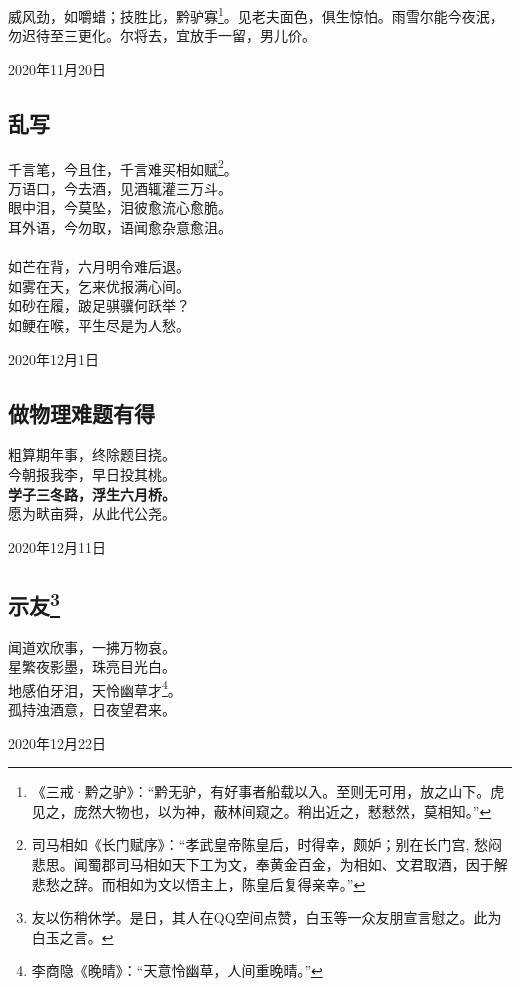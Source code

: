 \documentclass[a5paper]{ctexart}
\begin{document}
	威风劲，如嚼蜡；技胜比，黔驴寡\footnote{《三戒·黔之驴》：“黔无驴，有好事者船载以入。至则无可用，放之山下。虎见之，庞然大物也，以为神，蔽林间窥之。稍出近之，慭慭然，莫相知。”}。见老夫面色，俱生惊怕。雨雪尔能今夜泯，勿迟待至三更化。尔将去，宜放手一留，男儿价。
	\begin{flushright}
		2020年11月20日
	\end{flushright}
	
	\subsection{乱写}
	\begin{center}
		千言笔，今且住，千言难买相如赋\footnote{司马相如《长门赋序》：“孝武皇帝陈皇后，时得幸，颇妒；别在长门宫, 愁闷悲思。闻蜀郡司马相如天下工为文，奉黄金百金，为相如、文君取酒，因于解悲愁之辞。而相如为文以悟主上，陈皇后复得亲幸。”}。\\
		万语口，今去酒，见酒辄灌三万斗。\\
		眼中泪，今莫坠，泪彼愈流心愈脆。\\
		耳外语，今勿取，语闻愈杂意愈沮。\\ \hspace*{\fill} \\
		
		如芒在背，六月明令难后退。\\
		如雾在天，乞来优报满心间。\\
		如砂在履，跛足骐骥何跃举？\\
		如鲠在喉，平生尽是为人愁。
	\end{center}
	\hfill 2020年12月1日
	
	\subsection{做物理难题有得}
	\begin{center}
		粗算期年事，终除题目挠。\\
		今朝报我李，早日投其桃。\\
		\textbf{学子三冬路，浮生六月桥。}\\
		愿为畎亩舜，从此代公尧。
	\end{center}
	\hfill 2020年12月11日
	
	\subsection[示友]{示友\footnote{友以伤稍休学。是日，其人在QQ空间点赞，白玉等一众友朋宣言慰之。此为白玉之言。}}
	\begin{center}
		闻道欢欣事，一拂万物哀。\\
		星繁夜影墨，珠亮目光白。\\
		地感伯牙泪，天怜幽草才\footnote{李商隐《晚晴》：“天意怜幽草，人间重晚晴。”}。\\
		孤持浊酒意，日夜望君来。
	\end{center}
	\hfill 2020年12月22日
	
\end{document}
